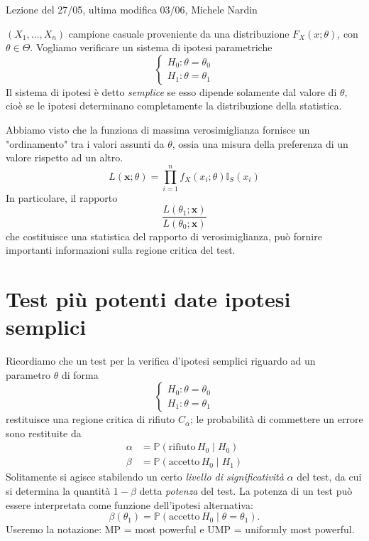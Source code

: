 
Lezione del 27/05, ultima modifica 03/06, Michele Nardin

\((X_1,\dots,X_n)\) campione casuale proveniente da una distribuzione
\(F_X(x;\theta)\), con \(\theta \in \Theta\). Vogliamo verificare un sistema di ipotesi parametriche
\begin{equation*}
  \begin{cases}
    H_0 \colon \theta = \theta_0 \\ H_1 \colon \theta = \theta_1
  \end{cases}
\end{equation*}
Il sistema di ipotesi è detto \emph{semplice} se esso dipende solamente dal valore di \(\theta\), cioè se le ipotesi determinano completamente la distribuzione della statistica.

Abbiamo visto che la funziona di massima verosimiglianza fornisce un "ordinamento" tra i valori assunti da \(\theta\), ossia una misura della preferenza di un valore rispetto ad un altro.
\begin{equation*}
  L(\mathbf{x};\theta) = \prod_{i=1}^n f_X(x_i;\theta)\mathbb{I}_S(x_i)
\end{equation*}
In particolare, il rapporto
\begin{equation*}
  \frac{L(\theta_1;\mathbf{x})}{L(\theta_0;\mathbf{x})}
\end{equation*}
che costituisce una statistica del rapporto di verosimiglianza, può fornire importanti informazioni sulla regione critica del test.


\section{Test più potenti date ipotesi semplici}

Ricordiamo che un test per la verifica d'ipotesi semplici riguardo ad un
parametro \(\theta\) di forma
\begin{equation*}
  \begin{cases}
    H_0 \colon \theta = \theta_0 \\ H_1 \colon \theta = \theta_1
  \end{cases}
\end{equation*}
restituisce una regione critica di rifiuto \(C_\alpha\); le
probabilità di commettere un errore sono restituite da
\begin{align*}
  \alpha &= \mathbb{P}(\text{rifiuto}\,H_0 \mid H_0) \\
  \beta  &= \mathbb{P}(\text{accetto}\,H_0 \mid H_1)
\end{align*}
Solitamente si agisce stabilendo un certo \emph{livello di significatività}
\(\alpha\) del test, da cui si determina la quantità \(1 - \beta\) detta
\emph{potenza} del test. La potenza di un test può essere interpretata
come funzione dell'ipotesi alternativa:
\begin{equation*}
  \beta(\theta_1) = \mathbb{P}(\text{accetto}\,H_0 \mid \theta = \theta_1).
\end{equation*}
Useremo la notazione: MP = most powerful e UMP = uniformly most powerful.\\

